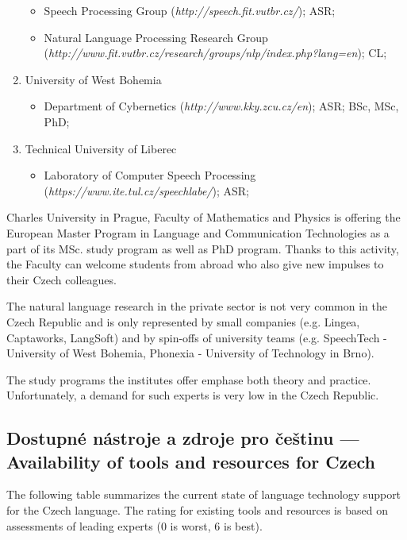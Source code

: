 \documentclass[]{../../metanetpaper}
\begin{document}
\begin{multicols}{2}
\begin{enumerate}
\begin{itemize}
  \item Speech Processing Group (\textit{http://speech.fit.vutbr.cz/}); ASR; 
  \end{itemize}
  \begin{itemize}
  \item Natural Language Processing Research Group (\textit{http://www.fit.vutbr.cz/research/groups/nlp/index.php?lang=en}); CL; 
  \end{itemize}
\item University of West Bohemia
  \begin{itemize}
  \item Department of Cybernetics (\textit{http://www.kky.zcu.cz/en}); ASR; BSc, MSc, PhD;
  \end{itemize}
\item Technical University of Liberec
  \begin{itemize}
  \item Laboratory of Computer Speech Processing (\textit{https://www.ite.tul.cz/speechlabe/}); ASR; 
  \end{itemize}
\end{enumerate}

Charles University in Prague, Faculty of Mathematics and Physics is offering the European Master Program in Language and Communication Technologies as a part of its MSc. study program as well as PhD program. Thanks to this activity, the Faculty can welcome students from abroad who also give new impulses to their Czech colleagues.

The natural language research in the private sector is not very common in the Czech Republic and is only represented by small companies (e.g. Lingea, Captaworks, LangSoft) and by spin-offs of university teams (e.g. SpeechTech - University of West Bohemia, Phonexia - University of Technology in Brno).

The study programs the institutes offer emphase both theory and practice. Unfortunately, a demand for such experts is very low in the Czech Republic.

\subsection{Dostupné nástroje a zdroje pro češtinu --- Availability of tools and resources for Czech}
The following table summarizes the current state of language technology support for the Czech language. The rating for existing tools and resources is based on assessments of leading experts (0 is worst, 6 is best).


\end{multicols}
\end{document}
